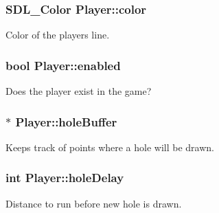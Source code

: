 \hypertarget{classPlayer_ad2ac07f900cc99b0248c36ef083f778f}{}
\subsubsection[{color}]{\setlength{\rightskip}{0pt plus 5cm}S\+D\+L\+\_\+\+Color Player\+::color\hspace{0.3cm}{\ttfamily [private]}}\label{classPlayer_ad2ac07f900cc99b0248c36ef083f778f}


Color of the player\textquotesingle{}s line. 

\hypertarget{classPlayer_a86ca9b85a70bf78c6109c728f311ca8c}{}
\subsubsection[{enabled}]{\setlength{\rightskip}{0pt plus 5cm}bool Player\+::enabled\hspace{0.3cm}{\ttfamily [private]}}\label{classPlayer_a86ca9b85a70bf78c6109c728f311ca8c}


Does the player exist in the game? 

\hypertarget{classPlayer_a1f4cf1d0ad8148a43a698a548d0d01f7}{}
\subsubsection[{hole\+Buffer}]{$\ast$ Player\+::hole\+Buffer\hspace{0.3cm}{\ttfamily [private]}}\label{classPlayer_a1f4cf1d0ad8148a43a698a548d0d01f7}


Keeps track of points where a hole will be drawn. 

\hypertarget{classPlayer_a51eb1ca4a5ecc06e99501900b8e8b7e8}{}
\subsubsection[{hole\+Delay}]{\setlength{\rightskip}{0pt plus 5cm}int Player\+::hole\+Delay\hspace{0.3cm}{\ttfamily [private]}}\label{classPlayer_a51eb1ca4a5ecc06e99501900b8e8b7e8}


Distance to run before new hole is drawn. 

